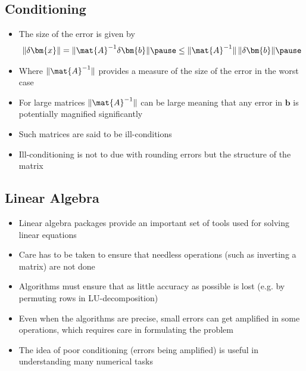 
\begin{slide}
\section{Conditioning}

\begin{PauseHighLight}
  \begin{itemize}
  \item The size of the error is given by
    \begin{align*}
      \|\delta \bm{x}\| = \| \mat{A}^{-1} \delta \bm{b}\| \pause \leq
      \| \mat{A}^{-1} \| \, \|\delta \bm{b}\|\pause
    \end{align*}
  \item Where $\| \mat{A}^{-1} \|$ provides a measure of the size of
    the error in the worst case\pause
  \item For large matrices $\| \mat{A}^{-1} \|$ can be large meaning
    that any error in $\bm{b}$ is potentially magnified significantly\pause
  \item Such matrices are said to be ill-conditions\pause
  \item Ill-conditioning is not to due with rounding errors but the
    structure of the matrix\pause
  \end{itemize}
\end{PauseHighLight}

\end{slide}


\begin{slide}
\section[-1]{Linear Algebra}

\begin{PauseHighLight}
  \begin{itemize}
  \item Linear algebra packages provide an important set of tools used
    for solving linear equations\pause
  \item Care has to be taken to ensure that needless operations (such as
    inverting a matrix) are not done\pause
  \item Algorithms must ensure that as little accuracy as possible is
    lost (e.g. by permuting rows in LU-decomposition)\pause
  \item Even when the algorithms are precise, small errors can get
    amplified in some operations, which requires care in formulating the
    problem\pause
  \item The idea of poor conditioning (errors being amplified) is useful
    in understanding many numerical tasks\pause
  \end{itemize}
\end{PauseHighLight}

\end{slide}

